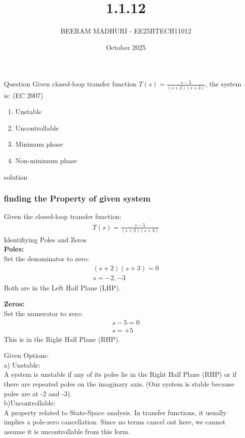 \documentclass{beamer}
\title %
{1.1.12}
\date{October  2025}
\author %
{BEERAM MADHURI - EE25BTECH11012}
\begin{document}
\frame{\titlepage}
\begin{frame}{Question}
Given closed-loop transfer function $T(s) = \frac{s-5}{(s+2)(s+3)}$, the system is: \hfill (EC 2007)

\begin{enumerate}
    \item[a)] Unstable
    \item[b)] Uncontrollable
    \item[c)] Minimum phase
    \item[d)] Non-minimum phase
\end{enumerate}
\end{frame}

\begin{frame}{solution}
    \frametitle{finding the Property of given system}
Given the closed-loop transfer function:
\begin{align}
    T(s) = \frac{s - 5}{(s + 2)(s + 3)}
\end{align}
Identifiying Poles and Zeros\\
\textbf{Poles:}\\
Set the denominator to zero: \\
\begin{align}
    (s + 2)(s + 3) = 0\\
    s = -2 ,-3
\end{align}
 Both are in the Left Half Plane (LHP).
\end{frame}
\begin{frame}
    \textbf{Zeros:}\\
Set the numerator to zero: 
\begin{align}{}
    s - 5 = 0\\
    s = +5
\end{align}
This is in the Right Half Plane (RHP).
\end{frame}
\begin{frame}{}
    Given Options:\\
a) Unstable:\\
A system is unstable if any of its poles lie in the Right Half Plane (RHP) or if there are repeated poles on the imaginary axis. (Our system is stable because poles are at -2 and -3).\\
b)Uncontrollable:\\
A property related to State-Space analysis. In transfer functions, it usually implies a pole-zero cancellation. Since no terms cancel out here, we cannot assume it is uncontrollable from this form.
\end{frame}
\end{document}

